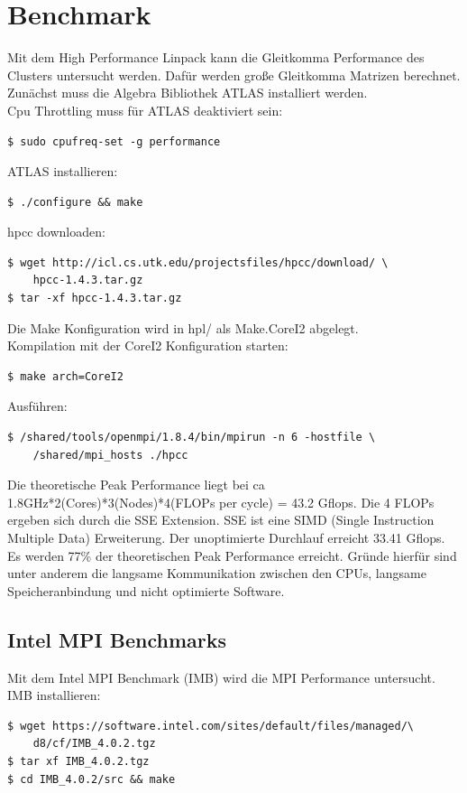 \chapter{Benchmark}
Mit dem High Performance Linpack kann die Gleitkomma Performance des Clusters untersucht werden. Dafür werden große Gleitkomma Matrizen berechnet.\\
Zunächst muss die Algebra Bibliothek ATLAS installiert werden.\\
Cpu Throttling muss für ATLAS deaktiviert sein:
\begin{lstlisting}[style=Bash]
$ sudo cpufreq-set -g performance
\end{lstlisting}
ATLAS installieren:
\begin{lstlisting}[style=Bash]
$ ./configure && make
\end{lstlisting}
hpcc downloaden:
\begin{lstlisting}[style=Bash]
$ wget http://icl.cs.utk.edu/projectsfiles/hpcc/download/ \
	hpcc-1.4.3.tar.gz
$ tar -xf hpcc-1.4.3.tar.gz
\end{lstlisting}
Die Make Konfiguration wird in hpl/ als Make.CoreI2 abgelegt.\\
Kompilation mit der CoreI2 Konfiguration starten:
\begin{lstlisting}[style=Bash]
$ make arch=CoreI2
\end{lstlisting}
Ausführen:
\begin{lstlisting}[style=Bash]
$ /shared/tools/openmpi/1.8.4/bin/mpirun -n 6 -hostfile \
	/shared/mpi_hosts ./hpcc
\end{lstlisting}
Die theoretische Peak Performance liegt bei ca 1.8GHz*2(Cores)*3(Nodes)*4(FLOPs per cycle) = 43.2 Gflops.
Die 4 FLOPs ergeben sich durch die SSE Extension. SSE ist eine SIMD (Single Instruction Multiple Data) Erweiterung.
Der unoptimierte Durchlauf erreicht 33.41 Gflops. Es werden 77\% der theoretischen Peak Performance erreicht.
Gründe hierfür sind unter anderem die langsame Kommunikation zwischen den CPUs, langsame Speicheranbindung und nicht optimierte Software.\\
\section{Intel MPI Benchmarks}
Mit dem Intel MPI Benchmark (IMB) wird die MPI Performance untersucht.\\
IMB installieren:
\begin{lstlisting}[style=Bash]
$ wget https://software.intel.com/sites/default/files/managed/\
	d8/cf/IMB_4.0.2.tgz
$ tar xf IMB_4.0.2.tgz
$ cd IMB_4.0.2/src && make
\end{lstlisting}
